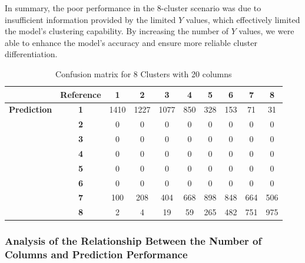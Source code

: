 \documentclass{article}
\begin{document}
In summary, the poor performance in the 8-cluster scenario was due to insufficient information provided by the limited \(Y\) values, which effectively limited the model's clustering capability. By increasing the number of \(Y\) values, we were able to enhance the model's accuracy and ensure more reliable cluster differentiation.

\begin{table}[htbp!]
  \centering


  \begin{minipage}{0.8\textwidth}
    \centering
    \begin{tabular}{c|c|c|c|c|c|c|c|c|c}
      & \textbf{Reference} & \textbf{1} & \textbf{2} & \textbf{3} & \textbf{4} & \textbf{5} & \textbf{6} & \textbf{7} & \textbf{8} \\
      \hline
      \textbf{Prediction} & \textbf{1} & 1410 & 1227 & 1077 & 850 & 328 & 153 & 71 & 31 \\
                          & \textbf{2} & 0 & 0 & 0 & 0 & 0 & 0 & 0 & 0 \\
                          & \textbf{3} & 0 & 0 & 0 & 0 & 0 & 0 & 0 & 0 \\
                          & \textbf{4} & 0 & 0 & 0 & 0 & 0 & 0 & 0 & 0 \\
                          & \textbf{5} & 0 & 0 & 0 & 0 & 0 & 0 & 0 & 0 \\
                          & \textbf{6} & 0 & 0 & 0 & 0 & 0 & 0 & 0 & 0 \\
                          & \textbf{7} & 100 & 208 & 404 & 668 & 898 & 848 & 664 & 506 \\
                          & \textbf{8} & 2 & 4 & 19 & 59 & 265 & 482 & 751 & 975 \\
    \end{tabular}
    \caption{Confusion matrix for 8 Clusters with 20 columns}
    \label{tab:8_clu}
  \end{minipage}

\end{table}

\clearpage

\subsubsection{Analysis of the Relationship Between the Number of Columns and Prediction Performance}
\end{document}
